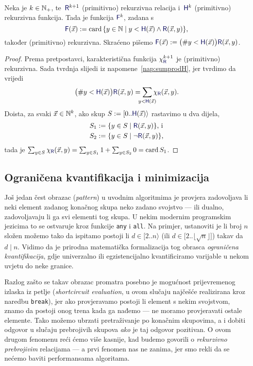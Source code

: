 \begin{lema}\label{lm:brojrek}
Neka je $k\in{\mathbb N}_+$, te\, $\f R^{k+1}$ (primitivno) rekurzivna relacija i\, $\f H^k$ (primitivno) rekurzivna funkcija. Tada je funkcija $\f F^k$, zadana s
\begin{equation}
    \f F(\vec x):=\card\,\{y\in\N\mid y<\f H(\vec x)\land\f R(\vec x,y)\}\text,
\end{equation}
također (primitivno) rekurzivna. Skraćeno pišemo $\f F(\vec x):=\bigl(\#y<\f H(\vec x)\bigr)\f R(\vec x,y)$.
\end{lema}
\begin{proof}
    Prema pretpostavci, karakteristična funkcija $\chi_{\f R}^{k+1}$ je (primitivno) rekurzivna. Sada tvrdnja slijedi iz napomene~\ref{nap:sumprodH}, jer tvrdimo da vrijedi
    \begin{equation}
        \bigl(\#y<\f H(\vec x)\bigr)\f R(\vec x,y)=\sum_{\mathclap{y<\f H(\vec x)}}\chi_{\f R}(\vec x,y)\text.
    \end{equation}
    Doista, za svaki $\vec x\in{\mathbb N}^k$, ako skup $S:=[0..\f H(\vec x)\rangle$ rastavimo u dva dijela,
    \begin{align}
        S_1&:=\{y\in S\mid\f R(\vec x,y)\}\text{, i}\\
        S_2&:=\{y\in S\mid\lnot\f R(\vec x,y)\}\text,
    \end{align}
    tada je
        $\sum_{y\in S}\chi_{\f R}(\vec x,y)=\sum_{y\in S_1}1+\sum_{y\in S_2}0=\card S_1$.
\end{proof}

\subsection{Ograničena kvantifikacija i minimizacija}

Još jedan čest obrazac (\emph{pattern}) u uvodnim algoritmima je provjera zadovoljava li neki element zadanog konačnog skupa neko zadano svojstvo --- ili dualno, zadovoljavaju li ga svi elementi tog skupa. U nekim modernim programskim jezicima to se ostvaruje kroz funkcije \texttt{any} i \texttt{all}. Na primjer, ustanoviti je li broj $n$ složen možemo tako da ispitamo postoji li $d\in[2..n\rangle$ (ili $d\in\bigl[2..\lfloor\!\sqrt{n}\rfloor\bigr]$) takav da $d\mathrel|n$. Vidimo da je prirodna matematička formalizacija tog obrasca \emph{ograničena kvantifikacija}, gdje univerzalno ili egzistencijalno kvantificiramo varijable u nekom uvjetu do neke granice.

Razlog zašto se takav obrazac promatra posebno je mogućnost prijevremenog izlaska iz petlje (\emph{shortcircuit evaluation}, u ovom slučaju najčešće realizirana kroz naredbu \texttt{break}), jer ako provjeravamo postoji li element s nekim svojstvom, znamo da postoji onog trena kada ga nađemo --- ne moramo provjeravati ostale elemente. Tako možemo ubrzati pretraživanje po konačnim skupovima, a i dobiti odgovor u slučaju prebrojivih skupova \emph{ako} je taj odgovor pozitivan. O ovom drugom fenomenu reći ćemo više kasnije, kad budemo govorili o \emph{rekurzivno prebrojivim} relacijama --- a prvi fenomen nas ne zanima, jer smo rekli da se nećemo baviti performansama algoritama.

